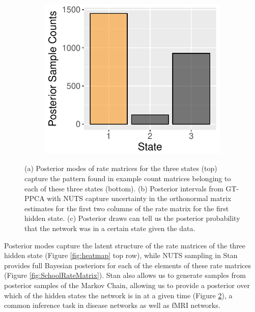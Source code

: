 \documentclass{article}
\begin{document}
\begin{figure}
\begin{subfigure}[b]{0.21\textwidth}
        \includegraphics[width=\textwidth]{SchoolStatePosterior.pdf}
        \caption{}
        \label{fig:SchoolStatePosterior}
    \end{subfigure}
    \caption{(a) Posterior modes of rate matrices for the three states (top) capture the pattern found in example count matrices belonging to each of these three states (bottom). (b) Posterior intervals from GT-PPCA with NUTS capture uncertainty in the orthonormal matrix estimates for the first two columns of the rate matrix for the first hidden state. (c) Posterior draws can tell us the posterior probability that the network was in a certain state given the data.}
\end{figure}

Posterior modes capture the latent structure of the rate matrices of the three hidden state (Figure \ref{fig:heatmap} top row), while NUTS sampling in Stan provides full Bayesian posteriors for each of the elements of these rate matrices (Figure \ref{fig:SchoolRateMatrix}). Stan also allows us to generate samples from posterior samples of the Markov Chain, allowing us to provide a posterior over which of the hidden states the network is in at a given time (Figure \ref{fig:SchoolStatePosterior}), a common inference task in disease networks as well as fMRI networks.


\end{document}
